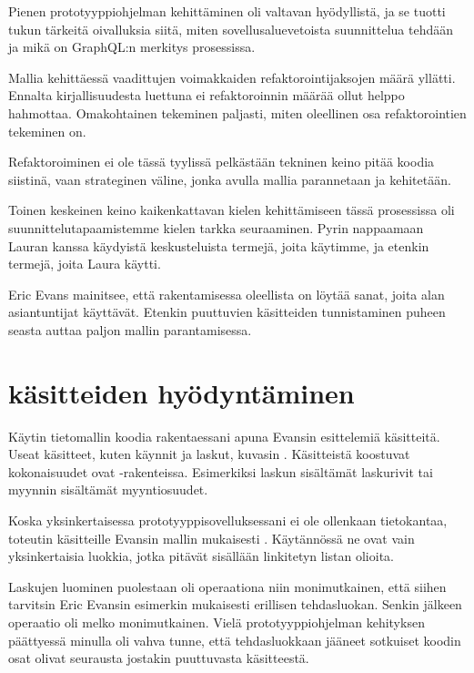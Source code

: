 Pienen prototyyppiohjelman kehittäminen oli valtavan hyödyllistä, ja se
tuotti tukun tärkeitä oivalluksia siitä, miten sovellusaluevetoista
suunnittelua tehdään ja mikä on GraphQL:n merkitys prosessissa.

Mallia kehittäessä vaadittujen voimakkaiden refaktorointijaksojen määrä
yllätti. Ennalta kirjallisuudesta luettuna ei refaktoroinnin määrää
ollut helppo hahmottaa. Omakohtainen tekeminen paljasti, miten
oleellinen osa 
refaktorointien tekeminen on.

Refaktoroiminen ei ole tässä tyylissä pelkästään tekninen keino pitää
koodia siistinä, vaan strateginen väline, jonka avulla mallia
parannetaan ja  kehitetään.

Toinen keskeinen keino kaikenkattavan kielen kehittämiseen tässä
prosessissa oli suunnittelutapaamistemme kielen tarkka seuraaminen.
Pyrin nappaamaan Lauran kanssa käydyistä keskusteluista termejä, joita
käytimme, ja etenkin termejä, joita Laura käytti.

Eric Evans mainitsee, että 
rakentamisessa oleellista on löytää sanat, joita alan asiantuntijat
käyttävät. Etenkin puuttuvien käsitteiden tunnistaminen puheen seasta
auttaa paljon mallin parantamisessa. \citep{evans:ddd}

\hypertarget{kuxe4sitteiden-hyuxf6dyntuxe4minen}{%
\section{\texorpdfstring{
käsitteiden
hyödyntäminen}{ käsitteiden hyödyntäminen}}\label{kuxe4sitteiden-hyuxf6dyntuxe4minen}}

Käytin tietomallin koodia rakentaessani apuna Evansin esittelemiä
käsitteitä. Useat käsitteet, kuten käynnit ja laskut, kuvasin
. Käsitteistä koostuvat kokonaisuudet
ovat -rakenteissa. Esimerkiksi laskun
sisältämät laskurivit tai myynnin sisältämät myyntiosuudet.

Koska yksinkertaisessa prototyyppisovelluksessani ei ole ollenkaan
tietokantaa, toteutin käsitteille Evansin mallin mukaisesti
. Käytännössä ne ovat vain
yksinkertaisia luokkia, jotka pitävät sisällään linkitetyn listan
olioita.

Laskujen luominen puolestaan oli operaationa niin monimutkainen, että
siihen tarvitsin Eric Evansin esimerkin mukaisesti erillisen
tehdasluokan. Senkin jälkeen operaatio oli melko monimutkainen. Vielä
prototyyppiohjelman kehityksen päättyessä minulla oli vahva tunne, että
tehdasluokkaan jääneet sotkuiset koodin osat olivat seurausta jostakin
puuttuvasta käsitteestä.

